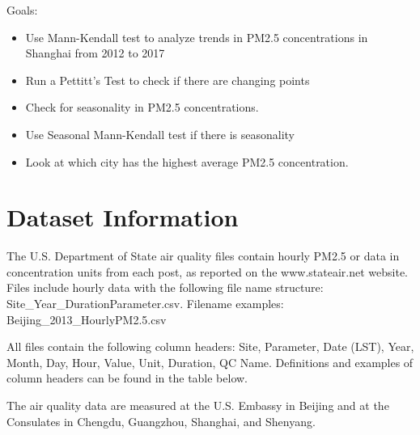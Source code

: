 \documentclass[12pt,]{article}
\providecommand{\tightlist}{%
  \setlength{\itemsep}{0pt}\setlength{\parskip}{0pt}}
\begin{document}
Goals:

\begin{itemize}
\tightlist
\item
  Use Mann-Kendall test to analyze trends in PM2.5 concentrations in
  Shanghai from 2012 to 2017
\item
  Run a Pettitt's Test to check if there are changing points
\item
  Check for seasonality in PM2.5 concentrations.
\item
  Use Seasonal Mann-Kendall test if there is seasonality
\item
  Look at which city has the highest average PM2.5 concentration.
\end{itemize}

\newpage

\section{Dataset Information}\label{dataset-information}

The U.S. Department of State air quality files contain hourly PM2.5 or
data in concentration units from each post, as reported on the
www.stateair.net website. Files include hourly data with the following
file name structure: Site\_Year\_DurationParameter.csv. Filename
examples: Beijing\_2013\_HourlyPM2.5.csv

All files contain the following column headers: Site, Parameter, Date
(LST), Year, Month, Day, Hour, Value, Unit, Duration, QC Name.
Definitions and examples of column headers can be found in the table
below.

The air quality data are measured at the U.S. Embassy in Beijing and at
the Consulates in Chengdu, Guangzhou, Shanghai, and Shenyang.
\end{document}

